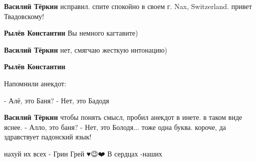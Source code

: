 \begin{itemize}
\begin{itemize}
\textbf{Василий Тёркин} исправил. спите спокойно в своем г. Nax, Switzerland. привет Твадовскому!

 
\textbf{Рылёв Константин}
Вы немного кагтавите)

 
\textbf{Василий Тёркин} нет, смягчаю жесткую интонацию)

 
\textbf{Рылёв Константин}

Напомнили анекдот:

- Алё, это Баня?
- Нет, это Бадодя


 
\textbf{Василий Тёркин} чтобы понять смысл, пробил анекдот в инете. в таком виде яснее. - Алло, это баня?
- Нет, это Болодя... тоже одна буква. короче, да здравствует падонский язык!

\end{itemize}

 
нахуй их всех - Грин Грей ♥️😉❤️
В сердцах -наших

 

\end{itemize}
